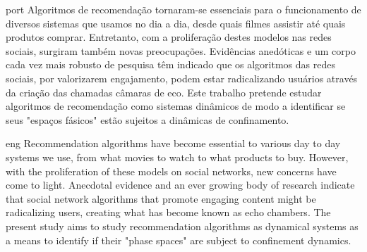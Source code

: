 
\begin{resumo}{port}
Algoritmos de recomendação tornaram-se essenciais para o funcionamento de
diversos sistemas que usamos no dia a dia, desde quais filmes assistir até quais
produtos comprar. Entretanto, com a proliferação destes modelos nas redes
sociais, surgiram também novas preocupações. Evidências anedóticas e um corpo
cada vez mais robusto de pesquisa têm indicado que os algoritmos das redes
sociais, por valorizarem engajamento, podem estar radicalizando usuários através
da criação das chamadas câmaras de eco. Este trabalho pretende estudar
algoritmos de recomendação como sistemas dinâmicos de modo a identificar se seus
"espaços fásicos" estão sujeitos a dinâmicas de confinamento.
\end{resumo}

\begin{resumo}{eng}
Recommendation algorithms have become essential to various day to day systems we
use, from what movies to watch to what products to buy. However, with the
proliferation of these models on social networks, new concerns have come to
light. Anecdotal evidence and an ever growing body of research indicate that
social network algorithms that promote engaging content might be radicalizing
users, creating what has become known as echo chambers. The present study aims
to study recommendation algorithms as dynamical systems as a means to identify
if their "phase spaces" are subject to confinement dynamics.
\end{resumo}
